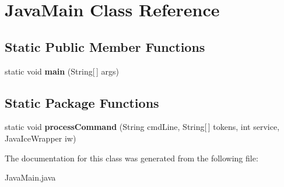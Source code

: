 \hypertarget{classJavaMain}{
\section{JavaMain Class Reference}
\label{classJavaMain}
}
\subsection*{Static Public Member Functions}
\begin{DoxyCompactItemize}
\item 
\hypertarget{classJavaMain_a9e97edf7f4592e50662e820a6911ae86}{
static void {\bfseries main} (String\mbox{[}$\,$\mbox{]} args)}
\label{classJavaMain_a9e97edf7f4592e50662e820a6911ae86}

\end{DoxyCompactItemize}
\subsection*{Static Package Functions}
\begin{DoxyCompactItemize}
\item 
\hypertarget{classJavaMain_abebbdca1500c605ce60f4d75c90299cf}{
static void {\bfseries processCommand} (String cmdLine, String\mbox{[}$\,$\mbox{]} tokens, int service, JavaIceWrapper iw)}
\label{classJavaMain_abebbdca1500c605ce60f4d75c90299cf}

\end{DoxyCompactItemize}


The documentation for this class was generated from the following file:\begin{DoxyCompactItemize}
\item 
JavaMain.java\end{DoxyCompactItemize}
